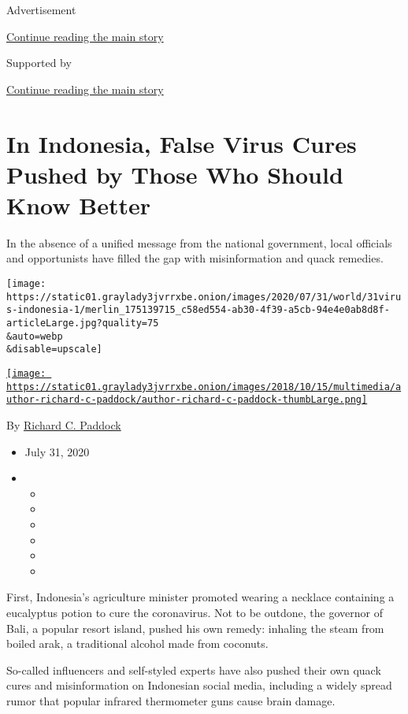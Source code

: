Advertisement

\protect\hyperlink{after-top}{Continue reading the main story}

Supported by

\protect\hyperlink{after-sponsor}{Continue reading the main story}

\hypertarget{in-indonesia-false-virus-cures-pushed-by-those-who-should-know-better}{%
\section{In Indonesia, False Virus Cures Pushed by Those Who Should Know
Better}\label{in-indonesia-false-virus-cures-pushed-by-those-who-should-know-better}}

In the absence of a unified message from the national government, local
officials and opportunists have filled the gap with misinformation and
quack remedies.

\texttt{[image: https://static01.graylady3jvrrxbe.onion/images/2020/07/31/world/31virus-indonesia-1/merlin\_175139715\_c58ed554-ab30-4f39-a5cb-94e4e0ab8d8f-articleLarge.jpg?quality=75\\\&auto=webp\\\&disable=upscale]}

\href{https://www.nytimes3xbfgragh.onion/by/richard-c-paddock}{\texttt{[image: https://static01.graylady3jvrrxbe.onion/images/2018/10/15/multimedia/author-richard-c-paddock/author-richard-c-paddock-thumbLarge.png]}}

By
\href{https://www.nytimes3xbfgragh.onion/by/richard-c-paddock}{Richard
C. Paddock}

\begin{itemize}
\item
  July 31, 2020
\item
  \begin{itemize}
  \item
  \item
  \item
  \item
  \item
  \item
  \end{itemize}
\end{itemize}

First, Indonesia's agriculture minister promoted wearing a necklace
containing a eucalyptus potion to cure the coronavirus. Not to be
outdone, the governor of Bali, a popular resort island, pushed his own
remedy: inhaling the steam from boiled arak, a traditional alcohol made
from coconuts.

So-called influencers and self-styled experts have also pushed their own
quack cures and misinformation on Indonesian social media, including a
widely spread rumor that popular infrared thermometer guns cause brain
damage.

